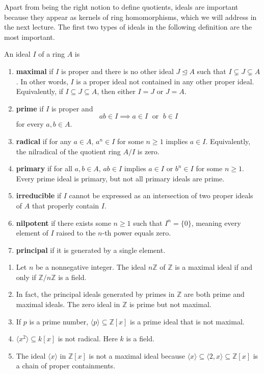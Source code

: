 \documentclass[11pt,a4paper]{article}
\begin{document}
Apart from being the right notion to define quotients, ideals are important because they 
appear as kernels of ring homomorphisms, which we will address in the next lecture.
The first two types of ideals in the following definition are the most important.
\begin{defi}
    An ideal \(I\) of a ring \(A\) is 
    \begin{enumerate}[label=(\roman*)]
        \item \textbf{maximal} if \(I\) is proper and there is no other ideal \(J \trianglelefteq A\) such that \(I\subsetneq J \subsetneq A\). In other words, \(I\) is a proper ideal not contained in any other proper ideal. Equivalently, if \(I\subseteq J\subseteq A\), then either \(I=J\) or \(J=A\).
        \item \textbf{prime} if \(I\) is proper and 
        \[ab\in I \implies a\in I\;\text{ or }\; b\in I\] for every \(a,b\in A\).
        \item \textbf{radical} if for any \(a \in A\), \(a^n \in I\) for some \(n \geq 1\) implies \(a \in I\). Equivalently, the nilradical of the quotient ring \(A/I\) is zero.
        \item \textbf{primary} if for all \(a, b \in A\), \(ab \in I\) implies \(a \in I\) or \(b^n \in I\) for some \(n \geq 1\). Every prime ideal is primary, but not all primary ideals are prime.
        \item \textbf{irreducible} if \(I\) cannot be expressed as an intersection of two proper ideals of \(A\) that properly contain \(I\).
        \item \textbf{nilpotent} if there exists some \(n \geq 1\) such that \(I^n = \{0\}\), meaning every element of \(I\) raised to the \(n\)-th power equals zero.
        \item \textbf{principal} if it is generated by a single element.
    \end{enumerate}
\end{defi}

\begin{exa}
\begin{enumerate}[label=(\roman*)]
\item Let $n$ be a nonnegative integer. The ideal $n \mathbb{Z}$ of $\mathbb{Z}$ is a maximal ideal if and only if $\mathbb{Z} / n \mathbb{Z}$ is a field. 

\item In fact, the principal ideals generated by primes in $\mathbb{Z}$ are both prime and maximal ideals. The zero ideal in $\mathbb{Z}$ is prime but not maximal.
\item If \(p\) is a prime number,  \(\langle p \rangle \subseteq \mathbb{Z}[x]\) is a prime ideal that is not  maximal.
\item  \(\langle x^2 \rangle \subseteq k[x]\) is not radical. Here \(k\) is a field.
\item The ideal $\langle x\rangle$ in $\mathbb{Z}[x]$ is not a maximal ideal because $\langle x\rangle \subseteq\langle 2, x\rangle \subseteq \mathbb{Z}[x]$ is a chain of proper containments.
\end{enumerate}
\end{exa}
\end{document}
